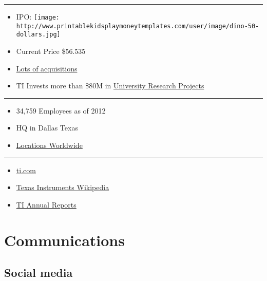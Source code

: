 \begin{center}\rule{3in}{0.4pt}\end{center}

\begin{itemize}
\itemsep1pt\parskip0pt
\item
  IPO:
  \texttt{[image: http://www.printablekidsplaymoneytemplates.com/user/image/dino-50-dollars.jpg]}
\item
  Current Price \$56.535
\item
  \href{http://www.ti.com/corp/docs/investor/compinfo/acquisitions.shtml}{Lots
  of acquisitions}
\item
  TI Invests more than \$80M in
  \href{http://www.ti.com/corp/docs/innovation/research-development/research-collaborations.html}{University
  Research Projects}
\end{itemize}

\begin{center}\rule{3in}{0.4pt}\end{center}

\begin{itemize}
\itemsep1pt\parskip0pt
\item
  34,759 Employees as of 2012
\item
  HQ in Dallas Texas
\item
  \href{http://careers.ti.com/content/locations}{Locations Worldwide}
\end{itemize}

\begin{center}\rule{3in}{0.4pt}\end{center}

\begin{itemize}
\itemsep1pt\parskip0pt
\item
  \href{http://ti.com}{ti.com}
\item
  \href{http://en.wikipedia.org/wiki/Texas_Instruments}{Texas
  Instruments Wikipedia}
\item
  \href{http://investor.ti.com/fininfo.cfm}{TI Annual Reports}
\end{itemize}

\section{Communications}\label{communications}

\subsection{Social media}\label{social-media}

